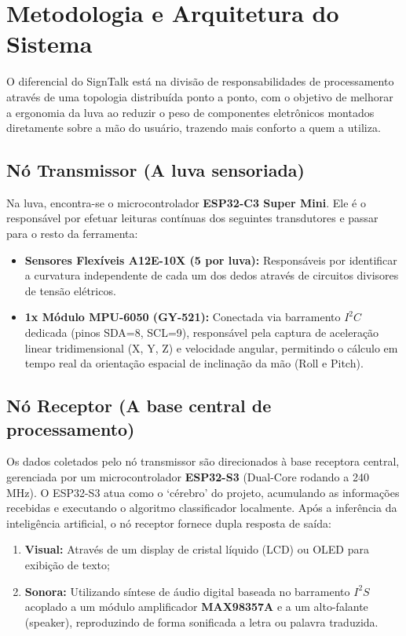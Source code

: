 \documentclass[12pt,a4paper]{article}
\begin{document}
\section{Metodologia e Arquitetura do Sistema}

O diferencial do SignTalk está na divisão de responsabilidades de processamento através de uma topologia distribuída ponto a ponto, com o objetivo de melhorar a ergonomia da luva ao reduzir o peso de componentes eletrônicos montados diretamente sobre a mão do usuário, trazendo mais conforto a quem a utiliza.

\subsection{Nó Transmissor (A luva sensoriada)}

Na luva, encontra-se o microcontrolador \textbf{ESP32-C3 Super Mini}. Ele é o responsável por efetuar leituras contínuas dos seguintes transdutores e passar para o resto da ferramenta:
\begin{itemize}
    \item \textbf{Sensores Flexíveis A12E-10X (5 por luva):} Responsáveis por identificar a curvatura independente de cada um dos dedos através de circuitos divisores de tensão elétricos.
    \item \textbf{1x Módulo MPU-6050 (GY-521):} Conectada via barramento $I^2C$ dedicada (pinos SDA=8, SCL=9), responsável pela captura de aceleração linear tridimensional (X, Y, Z) e velocidade angular, permitindo o cálculo em tempo real da orientação espacial de inclinação da mão (Roll e Pitch).
\end{itemize}

\subsection{Nó Receptor (A base central de processamento)}

Os dados coletados pelo nó transmissor são direcionados à base receptora central, gerenciada por um microcontrolador \textbf{ESP32-S3} (Dual-Core rodando a 240 MHz). O ESP32-S3 atua como o `cérebro' do projeto, acumulando as informações recebidas e executando o algoritmo classificador localmente. Após a inferência da inteligência artificial, o nó receptor fornece dupla resposta de saída:
\begin{enumerate}
    \item \textbf{Visual:} Através de um display de cristal líquido (LCD) ou OLED para exibição de texto;
    \item \textbf{Sonora:} Utilizando síntese de áudio digital baseada no barramento $I^2S$ acoplado a um módulo amplificador \textbf{MAX98357A} e a um alto-falante (speaker), reproduzindo de forma sonificada a letra ou palavra traduzida.
\end{enumerate}
\end{document}
